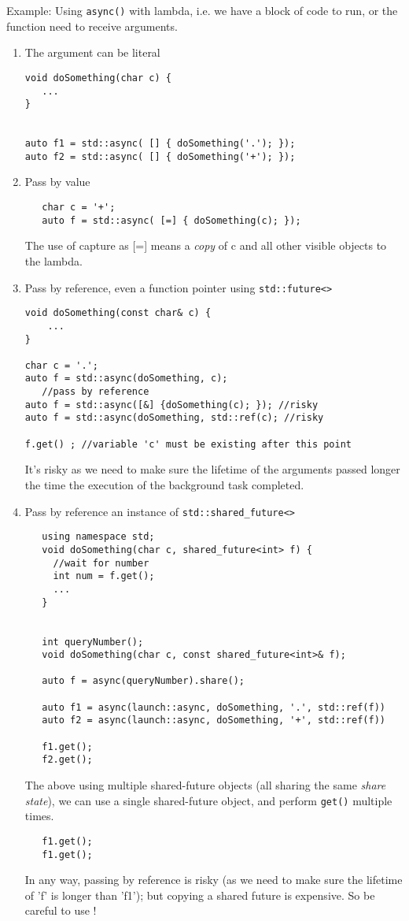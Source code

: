 Example: Using \verb!async()! with lambda, i.e. we have a block of code to run,
or the function need to receive arguments. 
\begin{enumerate}
  \item  The argument can be literal
\begin{lstlisting}
void doSomething(char c) {
   ...
}


auto f1 = std::async( [] { doSomething('.'); });
auto f2 = std::async( [] { doSomething('+'); });
\end{lstlisting}

   \item Pass by value 
   \begin{lstlisting}
   char c = '+';
   auto f = std::async( [=] { doSomething(c); });
   \end{lstlisting}
   The use of capture as [=] means a {\it copy} of c and all other visible
   objects to the lambda.
   
   \item Pass by reference, even a function pointer using \verb!std::future<>!
   \begin{lstlisting}
void doSomething(const char& c) {
    ...
}
   
char c = '.';
auto f = std::async(doSomething, c);
   //pass by reference
auto f = std::async([&] {doSomething(c); }); //risky
auto f = std::async(doSomething, std::ref(c); //risky

f.get() ; //variable 'c' must be existing after this point
\end{lstlisting}
   It's risky as we need to make sure the lifetime of the arguments passed
   longer the time the execution of the background task completed.
   
   \item Pass by reference an instance of \verb!std::shared_future<>! 
   \begin{lstlisting}
   using namespace std;
   void doSomething(char c, shared_future<int> f) {
     //wait for number
     int num = f.get(); 
     ...
   }
   
   
   int queryNumber();
   void doSomething(char c, const shared_future<int>& f);
   
   auto f = async(queryNumber).share();
   
   auto f1 = async(launch::async, doSomething, '.', std::ref(f))
   auto f2 = async(launch::async, doSomething, '+', std::ref(f))
   
   f1.get();
   f2.get();
   \end{lstlisting}
   The above using multiple shared-future objects (all sharing the same {\it
   share state}), we can use a single shared-future object, and perform
   \verb!get()! multiple times.
   \begin{lstlisting}
   f1.get();
   f1.get();
   \end{lstlisting}
   In any way, passing by reference is risky (as we need to make sure the
   lifetime of 'f' is longer than 'f1'); but copying a shared future is
   expensive. So be careful to use !
   

\end{enumerate}
